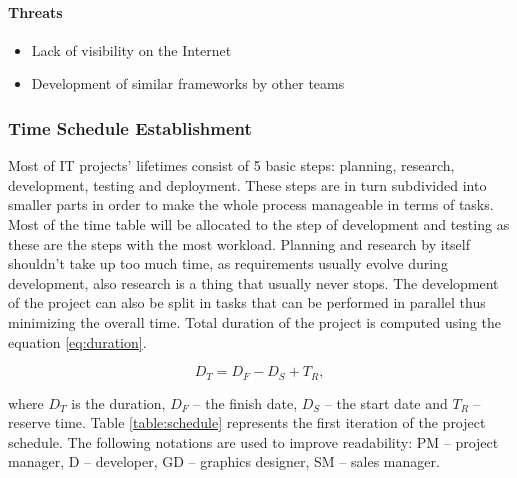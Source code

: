 \paragraph{Threats}

\begin{itemize}
    \item Lack of visibility on the Internet
    \item Development of similar frameworks by other teams
\end{itemize}

\subsubsection{Time Schedule Establishment}

Most of IT projects' lifetimes consist of 5 basic steps: planning, research,
development, testing and deployment. These steps are in turn subdivided into
smaller parts in order to make the whole process manageable in terms of tasks.
Most of the time table will be allocated to the step of development and
testing as these are the steps with the most workload. Planning and research
by itself shouldn't take up too much time, as requirements usually evolve
during development, also research is a thing that usually never stops. The
development of the project can also be split in tasks that can be performed in
parallel thus minimizing the overall time. Total duration of the project is
computed using the equation \eqref{eq:duration}.

\begin{equation} \label{eq:duration}
D_T = D_F - D_S + T_R,
\end{equation}

\noindent where $D_T$ is the duration, $D_F$ -- the finish date, $D_S$ -- the
start date and $T_R$ -- reserve time. Table \ref{table:schedule} represents
the first iteration of the project schedule. The following notations are used
to improve readability: PM -- project manager, D -- developer, GD -- graphics
designer, SM -- sales manager.

